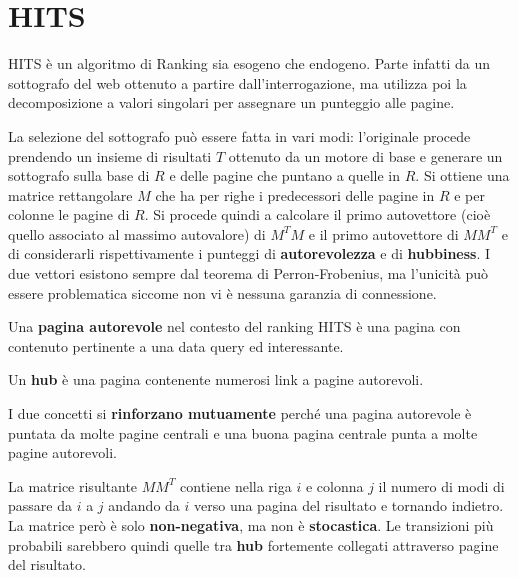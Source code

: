 \documentclass[\main/main.tex]{subfiles}
\begin{document}
\section{HITS}
\begin{multicols}{2}
\begin{definition}
    HITS è un algoritmo di Ranking sia esogeno che endogeno. Parte infatti da un sottografo del web ottenuto a partire dall'interrogazione, ma utilizza poi la decomposizione a valori singolari per assegnare un punteggio alle pagine.
    
    La selezione del sottografo può essere fatta in vari modi: l'originale procede prendendo un insieme di risultati \(T\) ottenuto da un motore di base e generare un sottografo sulla base di \(R\) e delle pagine che puntano a quelle in \(R\). Si ottiene una matrice rettangolare \(M\) che ha per righe i predecessori delle pagine in \(R\) e per colonne le pagine di \(R\). Si procede quindi a calcolare il primo autovettore (cioè quello associato al massimo autovalore) di \(M^T M\) e il primo autovettore di \(MM^T\) e di considerarli rispettivamente i punteggi di \textbf{autorevolezza} e di \textbf{hubbiness}. I due vettori esistono sempre dal teorema di Perron-Frobenius, ma l'unicità può essere problematica siccome non vi è nessuna garanzia di connessione.
\end{definition}
\begin{definition}
    Una \textbf{pagina autorevole} nel contesto del ranking HITS è una pagina con contenuto pertinente a una data query ed interessante.
\end{definition}
\begin{definition}
    Un \textbf{hub} è una pagina contenente numerosi link a pagine autorevoli.
\end{definition}
\begin{observation}
    I due concetti si \textbf{rinforzano mutuamente} perché una pagina autorevole è puntata da molte pagine centrali e una buona pagina centrale punta a molte pagine autorevoli.
\end{observation}
\begin{observation}
    La matrice risultante \(MM^T\) contiene nella riga \(i\) e colonna \(j\) il numero di modi di passare da \(i\) a \(j\) andando da \(i\) verso una pagina del risultato e tornando indietro. La matrice però è solo \textbf{non-negativa}, ma non è \textbf{stocastica}. Le transizioni più probabili sarebbero quindi quelle tra \textbf{hub} fortemente collegati attraverso pagine del risultato.

\end{observation}
\end{multicols}
\end{document}
